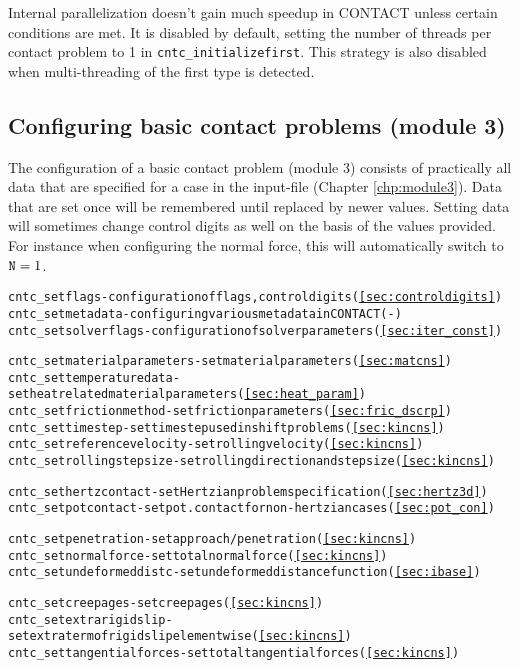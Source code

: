 \documentclass[12pt]{report}
\begin{document}
Internal parallelization doesn't gain much speedup in CONTACT unless
certain conditions are met. It is disabled by default, setting the number
of threads per contact problem to 1 in {\tt cntc\_initia\-li\-ze\-first}. This
strategy is also disabled when multi-threading of the first type is detected.

\subsection{Configuring basic contact problems (module 3)}

The configuration of a basic contact problem (module 3) consists of
practically all data that are specified for a case in the input-file (Chapter
\ref{chp:module3}). Data that are set once will be remembered until
replaced by newer values. Setting data will sometimes change control digits
as well on the basis of the values provided. For instance when configuring
the normal force, this will automatically switch to ${\tt N}=1$.
\begin{alltt}\small
cntc_setflags               - configuration of flags, control digits (\ref{sec:controldigits})
cntc_setmetadata            - configuring various metadata in CONTACT (-)
cntc_setsolverflags         - configuration of solver parameters (\ref{sec:iter_const})

cntc_setmaterialparameters  - set material parameters (\ref{sec:matcns})
cntc_settemperaturedata     - set heat related material parameters (\ref{sec:heat_param})
cntc_setfrictionmethod      - set friction parameters (\ref{sec:fric_dscrp})
cntc_settimestep            - set time step used in shift problems (\ref{sec:kincns})
cntc_setreferencevelocity   - set rolling velocity (\ref{sec:kincns})
cntc_setrollingstepsize     - set rolling direction and step size (\ref{sec:kincns})

cntc_sethertzcontact        - set Hertzian problem specification (\ref{sec:hertz3d})
cntc_setpotcontact          - set pot.contact for non-hertzian cases (\ref{sec:pot_con})

cntc_setpenetration         - set approach/penetration (\ref{sec:kincns})
cntc_setnormalforce         - set total normal force (\ref{sec:kincns})
cntc_setundeformeddistc     - set undeformed distance function (\ref{sec:ibase})

cntc_setcreepages           - set creepages (\ref{sec:kincns})
cntc_setextrarigidslip      - set extra term of rigid slip elementwise (\ref{sec:kincns})
cntc_settangentialforces    - set total tangential forces (\ref{sec:kincns})
\end{alltt}
\end{document}
